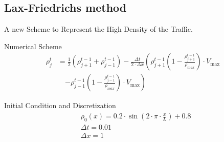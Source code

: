 \documentclass{beamer}
\begin{document}
\subsection{Lax-Friedrichs method}
\begin{frame}{A new Scheme to Represent the High Density of the Traffic.}
	\begin{alertblock}{Numerical Scheme}
		\begin{equation*}
			\begin{split}
				\rho_{j}^t &= \frac{1}{2} \left(\rho_{j+1}^{t-1} + \rho_{j-1}^{t-1}\right) 
			 - \frac{\Delta t}{2 \cdot \Delta x} \left( \rho_{j+1}^{t-1} \left(1 - \frac{\rho_{j+1}^{t-1}}{\rho_{max}}\right) \cdot V_{\text{max}} \right. \\
				&\quad \left. - \rho_{j-1}^{t-1} \left(1 - \frac{\rho_{j-1}^{t-1}}{\rho_{max}}\right) \cdot V_{\text{max}} \right)
			\end{split}
		\end{equation*}
		
	\end{alertblock}
	\begin{block}{Initial Condition and Discretization}
		\[
		\boxed{
			\begin{aligned}
				&\rho_0(x)=0.2 \cdot \sin\left(2 \cdot \pi \cdot \frac{x}{L}\right) + 0.8 \\
				&\Delta t = 0.01 \\
				&\Delta x = 1
			\end{aligned}
		}
		\]
	\end{block}
	
\end{frame}
\end{document}
